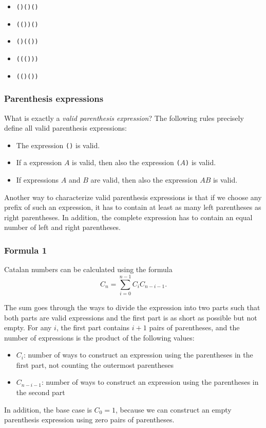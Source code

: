 \begin{itemize}[noitemsep]
\item \texttt{()()()}
\item \texttt{(())()}
\item \texttt{()(())}
\item \texttt{((()))}
\item \texttt{(()())}
\end{itemize}

\subsubsection{Parenthesis expressions}


What is exactly a \emph{valid parenthesis expression}?
The following rules precisely define all
valid parenthesis expressions:

\begin{itemize}
\item The expression \texttt{()} is valid.
\item If a expression $A$ is valid,
then also the expression
\texttt{(}$A$\texttt{)} is valid.
\item If expressions $A$ and $B$ are valid,
then also the expression $AB$ is valid.
\end{itemize}

Another way to characterize valid 
parenthesis expressions is that if
we choose any prefix of such an expression,
it has to contain at least as many left
parentheses as right parentheses.
In addition, the complete expression has to
contain an equal number of left and right
parentheses.

\subsubsection{Formula 1}

Catalan numbers can be calculated using the formula
\[ C_n = \sum_{i=0}^{n-1} C_{i} C_{n-i-1}.\]

The sum goes through the ways to divide the
expression into two parts
such that both parts are valid
expressions and the first part is as short as possible
but not empty.
For any $i$, the first part contains $i+1$ pairs
of parentheses, and the number of expressions
is the product of the following values:

\begin{itemize}
\item $C_{i}$: number of ways to construct an expression
using the parentheses in the first part,
not counting the outermost parentheses
\item $C_{n-i-1}$: number of ways to construct an
expression using the parentheses in the second part
\end{itemize}
In addition, the base case is $C_0=1$,
because we can construct an empty parenthesis
expression using zero pairs of parentheses.

